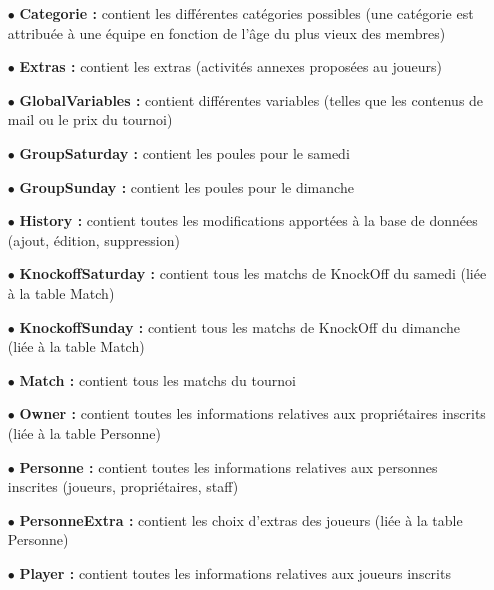 \documentclass{article}
\begin{document}
\begin{itemize}
\item[$\bullet$]{\textbf{Categorie :}} contient les différentes catégories possibles (une catégorie est attribuée
 à une équipe en fonction de l’âge du plus vieux des membres)

\item[$\bullet$]{\textbf{Extras :}} contient les extras (activités annexes proposées au joueurs)

\item[$\bullet$]{\textbf{GlobalVariables :}} contient différentes variables (telles que les contenus de mail ou le prix du tournoi)

\item[$\bullet$]{\textbf{GroupSaturday :}} contient les poules pour le samedi

\item[$\bullet$]{\textbf{GroupSunday :}} contient les poules pour le dimanche

\item[$\bullet$]{\textbf{History  :}}  contient  toutes  les  modifications  apportées  à  la  base  de  données (ajout, édition, suppression)

\item[$\bullet$]{\textbf{KnockoffSaturday :}} contient tous les matchs de Knock­Off du samedi (liée à la table Match)

\item[$\bullet$]{\textbf{KnockoffSunday  :}}  contient  tous  les  matchs  de  Knock­Off  du  dimanche  (liée  à  la table Match)

\item[$\bullet$]{\textbf{Match :}} contient tous les matchs du tournoi

\item[$\bullet$]{\textbf{Owner :}} contient toutes les informations relatives aux propriétaires inscrits (liée à la table Personne)

\item[$\bullet$]{\textbf{Personne  :}}  contient  toutes  les  informations  relatives  aux  personnes  inscrites (joueurs, propriétaires, staff)

\item[$\bullet$]{\textbf{PersonneExtra :}} contient les choix d’extras des joueurs (liée à la table Personne)

\item[$\bullet$]{\textbf{Player :}} contient toutes les informations relatives aux joueurs inscrits


\end{itemize}
\end{document}
